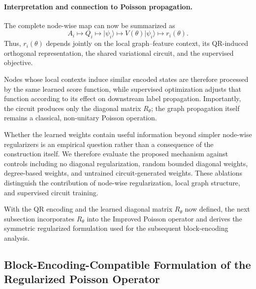 \documentclass[11pt,a4paper]{article}
\begin{document}
\paragraph{Interpretation and connection to Poisson propagation.}

The complete node-wise map can now be summarized as
\begin{equation}
A_i
\longmapsto
Q_i
\longmapsto
\lvert\psi_i\rangle
\longmapsto
V(\theta)\lvert\psi_i\rangle
\longmapsto
r_i(\theta).
\label{eq:qr_quantum_pipeline}
\end{equation}
Thus, \(r_i(\theta)\) depends jointly on the local graph--feature context,
its QR-induced orthogonal representation, the shared variational circuit, and
the supervised objective.

Nodes whose local contexts induce similar encoded states are therefore
processed by the same learned score function, while supervised optimization
adjusts that function according to its effect on downstream label
propagation. Importantly, the circuit produces only the diagonal matrix
\(R_\theta\); the graph propagation itself remains a classical, non-unitary
Poisson operation.

Whether the learned weights contain useful information beyond simpler
node-wise regularizers is an empirical question rather than a consequence of
the construction itself. We therefore evaluate the proposed mechanism against
controls including no diagonal regularization, random bounded diagonal
weights, degree-based weights, and untrained circuit-generated weights. These
ablations distinguish the contribution of node-wise regularization, local
graph structure, and supervised circuit training.

With the QR encoding and the learned diagonal matrix \(R_\theta\) now defined,
the next subsection incorporates \(R_\theta\) into the Improved Poisson
operator and derives the symmetric regularized formulation used for the
subsequent block-encoding analysis.



\subsection{Block-Encoding-Compatible Formulation of the Regularized Poisson Operator}
\label{subsec:block_encoding}
\end{document}
